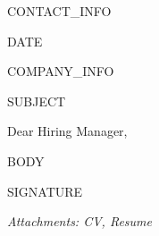 \documentclass[a4paper]{article}
\begin{document}
\noindent
{{CONTACT_INFO}}

\vspace{0.5cm}

{{DATE}}

\vspace{0.5cm}

{{COMPANY_INFO}}

\vspace{0.5cm}

{{SUBJECT}}

\vspace{0.3cm}

Dear Hiring Manager,

\vspace{0.3cm}

{{BODY}}

\vspace{0.3cm}

{{SIGNATURE}}

\vspace{0.3cm}

\textit{Attachments: CV, Resume}
\end{document}
